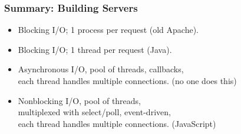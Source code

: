 \begin{frame}
  \frametitle{Summary: Building Servers}

  
    \begin{itemize}
      \item Blocking I/O; 1 process per request (old Apache).
      \item Blocking I/O; 1 thread per request (Java).
      \item Asynchronous I/O, pool of threads, callbacks, \\ each thread handles multiple connections. (no one does this)
      \item Nonblocking I/O, pool of threads, \\ multiplexed with select/poll,
        event-driven, \\ each thread handles multiple connections. (JavaScript)
    \end{itemize}
  

\end{frame}



